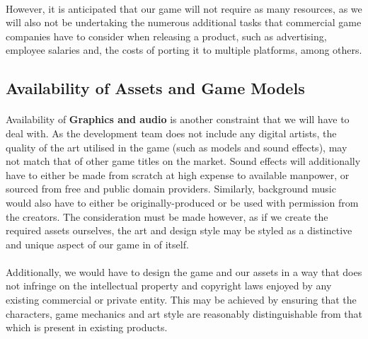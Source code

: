 \documentclass{article}
\begin{document}
\paragraph{}However, it is anticipated that our game will not require as many resources, as we will also not be undertaking the
numerous additional tasks that commercial game companies have to consider when releasing a product, such as advertising, employee salaries and, the costs of porting it to multiple platforms, among others.

\subsection{Availability of Assets and Game Models}

\paragraph{}Availability of \textbf{Graphics and audio} is another constraint that we will have to deal with. As the development team does not include any digital artists, the quality of the art utilised in the game (such as models and sound effects), may not match that of other game titles on the market. Sound effects will additionally have to either be made from scratch at high expense to available manpower, or sourced from free and public domain providers. Similarly, background music would also have to either be originally-produced or be used with permission from the creators. The consideration must be made however, as if we create the required assets ourselves, the art and design style may be styled as a distinctive and unique aspect of our game in of itself.

\paragraph{}Additionally, we would have to design the game and our assets in a way that does not infringe on the intellectual property and copyright laws enjoyed by any existing commercial or private entity. This may be achieved by ensuring that the characters, game mechanics and art style are reasonably distinguishable from that which is present in existing products.
\end{document}
